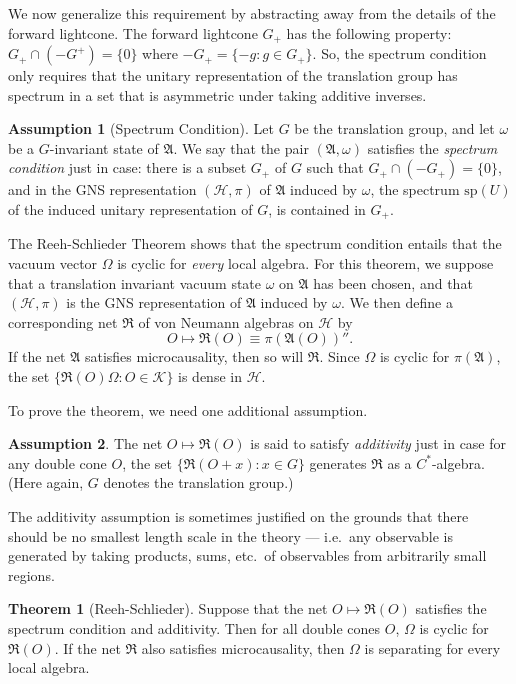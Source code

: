 \documentclass[11pt]{article}
\newcommand{\alg}[1]{\mathfrak{#1}}
\theoremstyle{definition}
\newtheorem{assumption}{Assumption}
\newtheorem{thm}{Theorem}[section]
\theoremstyle{definition}
\theoremstyle{remark}
\def\2#1{{\mathcal #1}}
\def\al#1{{\mathfrak #1}}
\def\om{\omega} \def\Om{\Omega} \def\dd{\partial} \def\D{\Delta}
\begin{document}
We now generalize this requirement by abstracting away
from the details of the forward lightcone.  The forward
lightcone $G_+$ has the following property: $G_+\cap
(-G^+)=\{ 0\}$ where $-G_+=\{ -g:g\in G_+\}$.  So, the
spectrum condition only requires that the unitary
representation of the translation group has spectrum in
a set that is asymmetric under taking additive
inverses.

\begin{assumption}[Spectrum Condition] Let $G$ be the translation
  group, and let $\om$ be a $G$-invariant state of $\al A$.  We say
  that the pair $(\al A,\om )$ satisfies the \emph{spectrum condition}
  just in case: there is a subset $G_+$ of $G$ such that $G_+\cap
  (-G_+)=\{ 0\}$, and in the GNS representation $(\2H ,\pi )$ of $\al
  A$ induced by $\om$, the spectrum $\mathrm{sp}(U)$ of the induced
  unitary representation of $G$, is contained in $G_+$.
  \label{spectrum}
\end{assumption}

The Reeh-Schlieder Theorem shows that the spectrum
condition entails that the vacuum vector $\Om$ is
cyclic for \emph{every} local algebra.  For this
theorem, we suppose that a translation invariant vacuum
state $\om$ on $\alg{A}$ has been chosen, and that
$(\2H ,\pi )$ is the GNS representation of $\alg{A}$
induced by $\om$.  We then define a corresponding net
$\alg{R}$ of von Neumann algebras on $\2H$ by
$$O\mapsto \alg{R}(O)\equiv \pi
(\alg{A}(O))'' .$$ If the net $\alg{A}$ satisfies microcausality, then so will
$\alg{R}$.  Since $\Om$ is cyclic for $\pi (\alg{A})$, the set $\{ \alg{R}(O)\Om
:O\in \2K \}$ is dense in $\2H$.

To prove the theorem, we need one additional assumption.
\begin{assumption} The net $O\mapsto \alg{R}(O)$ is
  said to satisfy \emph{additivity} just in case for
  any double cone $O$, the set $\{ \al R(O+x):x\in G\}$
  generates $\al R$ as a $C^*$-algebra. (Here again,
  $G$ denotes the translation group.)  \label{add}
\end{assumption}
The additivity assumption is sometimes justified on the grounds that there should be
no smallest length scale in the theory --- i.e.\ any observable is generated by
taking products, sums, etc.\ of observables from arbitrarily small regions.

\begin{thm}[Reeh-Schlieder] Suppose that the net $O\mapsto \alg{R}(O)$ satisfies the
  spectrum condition and additivity.  Then for all double cones $O$, $\Om$ is cyclic
  for $\alg{R}(O)$.  If the net $\alg{R}$ also satisfies microcausality, then $\Om$
  is separating for every local algebra.
\end{thm}
\end{document}
